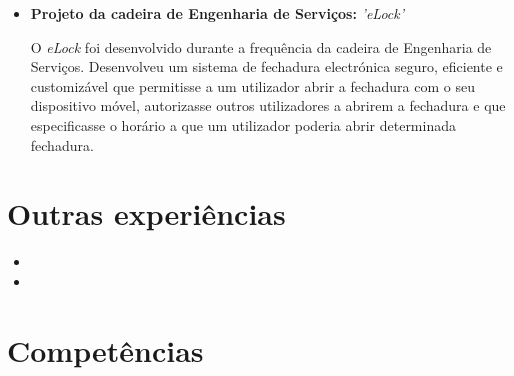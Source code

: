 \documentclass[11pt,a4paper,sans]{moderncv} %
\begin{document}
\begin{itemize}
\vspace{6pt}

\item{\textbf{Projeto da cadeira de Engenharia de Serviços: }\textit{'eLock'}

\vspace{3pt}

\small{O \textit{eLock} foi desenvolvido durante a frequência da cadeira de
  Engenharia de Serviços. Desenvolveu um sistema de fechadura electrónica
  seguro, eficiente e customizável que permitisse a um utilizador abrir a
  fechadura com o seu dispositivo móvel, autorizasse outros utilizadores a
  abrirem a fechadura e que especificasse o horário a que um utilizador poderia
  abrir determinada fechadura.}}

\end{itemize}

\section{Outras experiências}

\vspace{6pt}

\begin{itemize}
\item{}

\vspace{6pt}

\item{}
\end{itemize}

\section{Competências}

\vspace{6pt}
\end{document}
